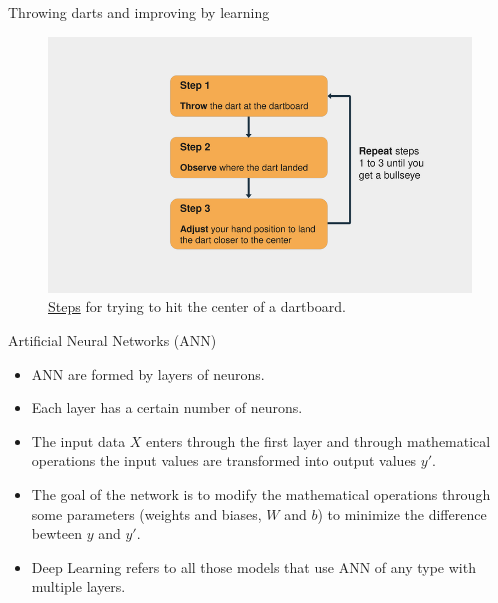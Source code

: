 \documentclass{beamer}
\begin{document}
\begin{frame}{Throwing darts and improving by learning}
    \begin{figure}
        \includegraphics[width=0.9\linewidth]{TrainingDart}
        \caption{\href{https://realpython.com/python-ai-neural-network/}{Steps} for trying to hit the center of a dartboard.}
        \label{Fig:TrainingDart}
    \end{figure}
\end{frame}


\begin{frame}{Artificial Neural Networks (ANN)}
    \begin{itemize}
        \item ANN are formed by layers of neurons.
        \item Each layer has a certain number of neurons.
        \item The input data $X$ enters through the first layer and through mathematical operations the input values are transformed into output values $y'$.
        \item The goal of the network is to modify the mathematical operations through some parameters (weights and biases, $W$ and $b$) to minimize the difference bewteen $y$ and $y'$.
        \item Deep Learning refers to all those models that use ANN of any type with multiple layers.
    \end{itemize}
\end{frame}
\end{document}
